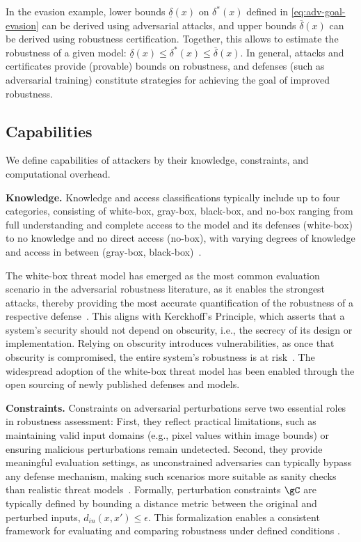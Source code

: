%
In the evasion example, lower bounds $\underline{\delta}(x)$ on $\delta^*(x)$ defined in \autoref{eq:adv-goal-evasion} can be derived using adversarial attacks, and upper bounds $\overline{\delta}(x)$ can be derived using robustness certification. Together, this allows to estimate the robustness of a given model: $\underline{\delta}(x) \leq \delta^*(x) \leq \overline{\delta}(x)$. In general, attacks and certificates provide (provable) bounds on robustness, and defenses (such as adversarial training) constitute strategies for achieving the goal of improved robustness.
\vspace{-5pt}
\subsection{Capabilities}\label{sec:tax-capability}%
We define capabilities of attackers by their knowledge, constraints, and computational overhead. 

\textbf{Knowledge.} Knowledge and access classifications typically include up to four categories, consisting of white-box, gray-box, black-box, and no-box ranging from full understanding and complete access to the model and its defenses (white-box) to no knowledge and no direct access (no-box), with varying degrees of knowledge and access in between (gray-box, black-box)~\citep{papernot_practical_2017, bose_adversarial_2020}.

The white-box threat model has emerged as the most common evaluation scenario in the adversarial robustness literature, as it enables the strongest attacks, thereby providing the most accurate quantification of the robustness of a respective defense~\citep{papernot_practical_2017}.
This aligns with Kerckhoff's Principle, which asserts that a system's security should not depend on obscurity, i.e., the secrecy of its design or implementation. Relying on obscurity introduces vulnerabilities, as once that obscurity is compromised, the entire system's robustness is at risk~\citep{sasa_kerk_2008,athalye_obfuscated_2018}.
The widespread adoption of the white-box threat model has been enabled through the open sourcing of newly published defenses and models.

\textbf{Constraints.} Constraints on adversarial perturbations serve two essential roles in robustness assessment: First, they reflect practical limitations, such as maintaining valid input domains (e.g., pixel values within image bounds) or ensuring malicious perturbations remain undetected. Second, they provide meaningful evaluation settings, as unconstrained adversaries can typically bypass any defense mechanism, making such scenarios more suitable as sanity checks than realistic threat models~\cite{goodfellow_explaining_2015}.
Formally, perturbation constraints $\gC$ are typically defined by bounding a distance metric between the original and perturbed inputs, $d_{in}(x, x') \leq \epsilon$. This formalization enables a consistent framework for evaluating and comparing robustness under defined conditions \cite{carlini_evaluating_2019}.

